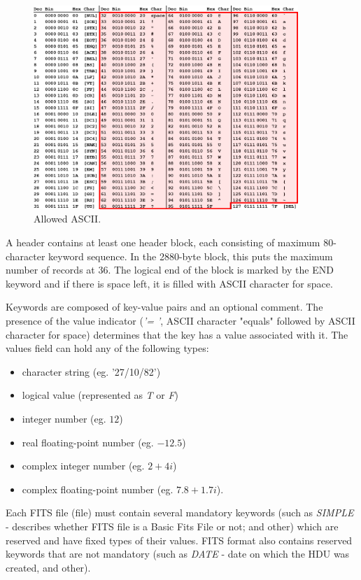 	\begin{figure}[H]
	\centering
	  \includegraphics[width=10cm]{images/asciifull}
		  \caption{Allowed ASCII.}
	  \label{fig:allowed_ascii}
	\end{figure}
	
	A header contains at least one header block, each consisting of maximum 80-character keyword sequence. In the 2880-byte block, this puts the maximum number of records at 36. The logical end of the block is marked by the END keyword and if there is space left, it is filled with ASCII character for space.
	
	Keywords are composed of key-value pairs and an optional comment. The presence of the value indicator (\emph{'= '}, ASCII character "equals" followed by ASCII character for space) determines that the key has a value associated with it. The values field can hold any of the following types:
	
	\begin{itemize}
		\item character string (eg. '27/10/82')
		\item logical value (represented as \emph{T} or \emph{F})
		\item integer number (eg. $12$)
		\item real floating-point number (eg. $-12.5$)
		\item complex integer number (eg. $2+4i$)
		\item complex floating-point number (eg. $7.8+1.7i$).
	\end{itemize}
	
	 Each FITS file (file) must contain several mandatory keywords (such as \emph{SIMPLE} - describes whether FITS file is a Basic Fits File or not; and other) which are reserved and have fixed types of their values. FITS format also contains reserved keywords that are not mandatory (such as \emph{DATE} - date on which the HDU was created, and other).
	 
